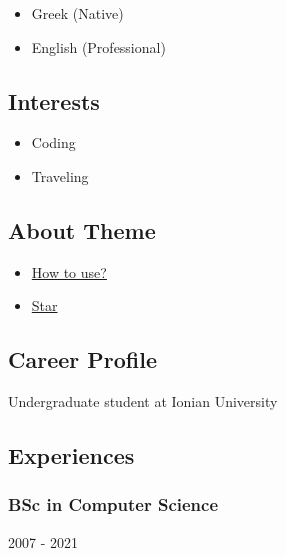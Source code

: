 \documentclass[english,]{article}
\providecommand{\tightlist}{%
  \setlength{\itemsep}{0pt}\setlength{\parskip}{0pt}}
\begin{document}
\begin{itemize}
\tightlist
\item
  Greek {(Native)}
\item
  English {(Professional)}
\end{itemize}

\hypertarget{interests}{%
\subsection{Interests}\label{interests}}

\begin{itemize}
\tightlist
\item
  Coding
\item
  Traveling
\end{itemize}

\hypertarget{about-theme}{%
\subsection{About Theme}\label{about-theme}}

\begin{itemize}
\tightlist
\item
  \href{https://www.youtube.com/watch?v=Jnmj1dXDbNk}{How to use?}
\item
  \href{https://github.com/sharu725/online-cv}{Star}
\end{itemize}

\hypertarget{career-profile}{%
\subsection{\texorpdfstring{{ \emph{} \emph{} } Career
Profile}{    Career Profile}}\label{career-profile}}

Undergraduate student at Ionian University

\hypertarget{experiences}{%
\subsection{\texorpdfstring{{ \emph{} \emph{} }
Experiences}{    Experiences}}\label{experiences}}

\hypertarget{bsc-in-computer-science-1}{%
\subsubsection{BSc in Computer
Science}\label{bsc-in-computer-science-1}}

2007 - 2021
\end{document}
